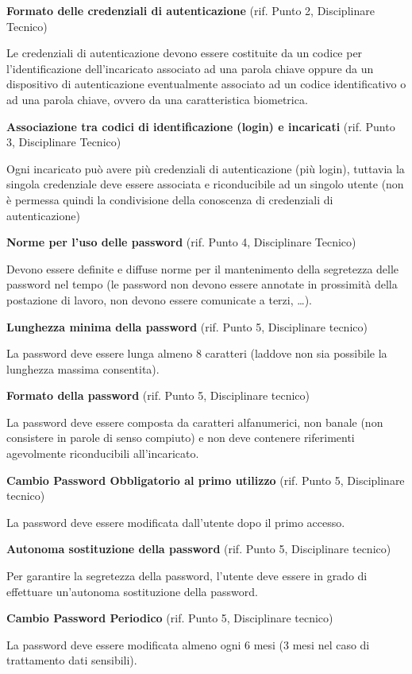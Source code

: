 \textbf{Formato delle credenziali di autenticazione} (rif. Punto 2, Disciplinare Tecnico)

Le credenziali di autenticazione devono essere costituite da un codice
per l'identificazione dell'incaricato associato ad una parola chiave oppure da un dispositivo di
autenticazione eventualmente associato ad un codice identificativo o ad
una parola chiave, ovvero da una caratteristica biometrica.


\textbf{Associazione tra codici di identificazione (login) e incaricati} (rif. Punto 3, Disciplinare Tecnico)

Ogni incaricato pu\`o avere pi\`u credenziali di autenticazione (pi\`u
login), tuttavia la singola credenziale deve essere associata e
riconducibile ad un singolo utente (non \`e permessa quindi la
condivisione della conoscenza di credenziali di autenticazione)


\textbf{Norme per l'uso delle password} (rif. Punto 4, Disciplinare Tecnico)

Devono essere definite e diffuse norme per il mantenimento della
segretezza delle password nel tempo (le password non devono essere
annotate in prossimit\`a della postazione di lavoro, non devono essere
comunicate a terzi, \ldots).


\textbf{Lunghezza minima della password} (rif. Punto 5, Disciplinare tecnico)

La password deve essere lunga almeno 8 caratteri (laddove non sia
possibile la lunghezza massima consentita).


\textbf{Formato della password} (rif. Punto 5, Disciplinare tecnico)

La password deve essere composta da caratteri alfanumerici, non banale
(non consistere in parole di senso compiuto) e non deve contenere
riferimenti agevolmente riconducibili all'incaricato.


\textbf{Cambio Password Obbligatorio al primo utilizzo} (rif. Punto 5, Disciplinare tecnico)

La password deve essere modificata dall'utente dopo il primo accesso.


\textbf{Autonoma sostituzione della password} (rif. Punto 5, Disciplinare tecnico)

Per garantire la segretezza della password, l'utente
deve essere in grado di effettuare un'autonoma
sostituzione della password.


\textbf{Cambio Password Periodico} (rif. Punto 5, Disciplinare tecnico)

La password deve essere modificata almeno ogni 6 mesi (3 mesi nel caso
di trattamento dati sensibili).


